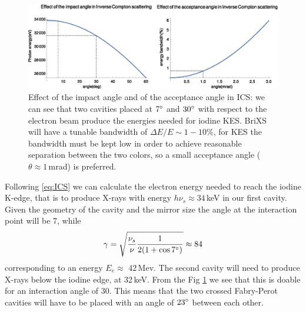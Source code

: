\begin{figure}
	\centering
	\includegraphics[width=1\linewidth]{images/ics.eps}
	\caption{Effect of the impact angle and of the acceptance angle in ICS: we can see that two cavities placed at $7\degree$ and $30\degree$ with respect to the electron beam produce the energies needed for iodine KES. BriXS will have a tunable bandwidth of $\Delta E/E \sim 1-10\%$, for KES the bandwidth must be kept low in order to achieve reasonable separation between the two colors, so a small acceptance angle ($\theta \approx 1$\,mrad) is preferred.}
	\label{fig:ics}
\end{figure}
Following \ref{eq:ICS} we can calculate the electron energy needed to reach the iodine K-edge, that is to produce X-rays with energy $h \nu_s \approx 34$\,keV in our first cavity. Given the geometry of the cavity and the mirror size the angle at the interaction point will be 7\degree, while
\begin{align}
\gamma = \sqrt{\frac{\nu_s}{\nu}\frac{1}{2(1+\cos 7 \degree)}} \approx 84
\end{align}
corresponding to an energy $E_e \approx$ 42\,Mev.
The second cavity will need to produce X-rays below the iodine edge, at 32\,keV. From the Fig \ref{fig:ics} we see that this is doable for an interaction angle of 30\degree. This means that the two crossed Fabry-Perot cavities will have to be placed with an angle of $23\degree$ between each other.

